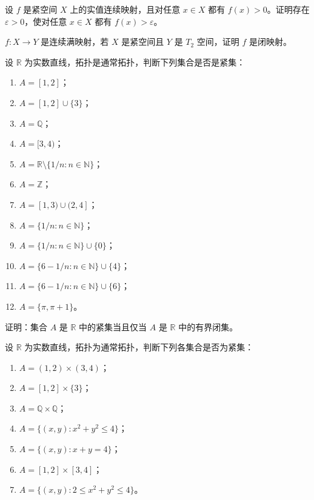 \begin{homework}[5.5]
设 $f$ 是紧空间 $X$ 上的实值连续映射，且对任意 $x\in X$ 都有 $f(x)>0$。证明存在 $\varepsilon>0$，使对任意 $x\in X$ 都有 $f(x)>\varepsilon$。
\end{homework}

\begin{homework}[10]
$f:X\to Y$ 是连续满映射，若 $X$ 是紧空间且 $Y$ 是 $T_2$ 空间，证明 $f$ 是闭映射。
\end{homework}

\begin{homework}[11]
设 $\mathbb R$ 为实数直线，拓扑是通常拓扑，判断下列集合是否是紧集：
\begin{enumerate}
  \item $A=[1,2]$；
  \item $A=[1,2]\cup\{3\}$；
  \item $A=\mathbb{Q}$；
  \item $A=[3,4)$；
  \item $A=\mathbb{R}\setminus\{1/n:n\in\mathbb{N}\}$；
  \item $A=\mathbb{Z}$；
  \item $A=[1,3)\cup(2,4]$；
  \item $A=\{1/n:n\in\mathbb{N}\}$；
  \item $A=\{1/n:n\in\mathbb{N}\}\cup\{0\}$；
  \item $A=\{6-1/n:n\in\mathbb{N}\}\cup\{4\}$；
  \item $A=\{6-1/n:n\in\mathbb{N}\}\cup\{6\}$；
  \item $A=\{\pi,\pi+1\}$。
\end{enumerate}
\end{homework}

\begin{homework}[4]
证明：集合 $A$ 是 $\mathbb R$ 中的紧集当且仅当 $A$ 是 $\mathbb R$ 中的有界闭集。
\end{homework}

\begin{homework}[12]
设 $\mathbb{R}$ 为实数直线，拓扑为通常拓扑，判断下列各集合是否为紧集：
\begin{enumerate}
  \item $A=(1,2)\times(3,4)$；
  \item $A=[1,2]\times\{3\}$；
  \item $A=\mathbb{Q}\times\mathbb{Q}$；
  \item $A=\{(x,y):x^{2}+y^{2}\le 4\}$；
  \item $A=\{(x,y):x+y=4\}$；
  \item $A=[1,2]\times[3,4]$；
  \item $A=\{(x,y):2\le x^{2}+y^{2}\le 4\}$。
\end{enumerate}
\end{homework}

